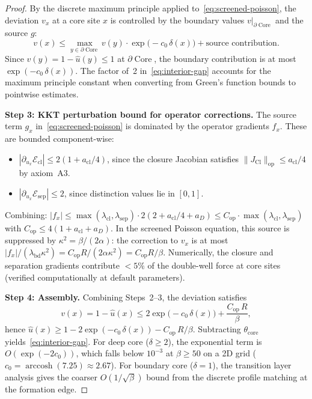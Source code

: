\documentclass[lettersize,journal]{IEEEtran}
\DeclareMathOperator{\Cl}{Cl}
\DeclareMathOperator{\Core}{Core}
\begin{document}
\begin{proof}
By the discrete maximum principle applied to~\eqref{eq:screened-poisson}, the deviation $v_x$ at a core site $x$ is controlled by the boundary values $v|_{\partial\Core}$ and the source $g$:
\[
v(x) \leq \max_{y \in \partial\Core} v(y) \cdot \exp\!\bigl(-c_0\,\delta(x)\bigr) + \text{source contribution}.
\]
Since $v(y) = 1 - \hat{u}(y) \leq 1$ at $\partial\Core$, the boundary contribution is at most $\exp(-c_0\,\delta(x))$. The factor of~2 in~\eqref{eq:interior-gap} accounts for the maximum principle constant when converting from Green's function bounds to pointwise estimates.

\medskip\noindent\textbf{Step 3: KKT perturbation bound for operator corrections.}
The source term $g_x$ in~\eqref{eq:screened-poisson} is dominated by the operator gradients $f_x$. These are bounded component-wise:
\begin{itemize}
\item $|\partial_{u_x}\mathcal{E}_{\mathrm{cl}}| \leq 2(1 + a_{\mathrm{cl}}/4)$, since the closure Jacobian satisfies $\|J_{\Cl}\|_{\mathrm{op}} \leq a_{\mathrm{cl}}/4$ by axiom~A3.
\item $|\partial_{u_x}\mathcal{E}_{\mathrm{sep}}| \leq 2$, since distinction values lie in $[0,1]$.
\end{itemize}
Combining: $|f_x| \leq \max(\lambda_{\mathrm{cl}}, \lambda_{\mathrm{sep}}) \cdot 2(2 + a_{\mathrm{cl}}/4 + a_D) \leq C_{\mathrm{op}} \cdot \max(\lambda_{\mathrm{cl}}, \lambda_{\mathrm{sep}})$ with $C_{\mathrm{op}} \leq 4(1 + a_{\mathrm{cl}} + a_D)$. In the screened Poisson equation, this source is suppressed by $\kappa^2 = \beta/(2\alpha)$: the correction to $v_x$ is at most $|f_x|/(\lambda_{\mathrm{bd}}\kappa^2) = C_{\mathrm{op}} R/(2\alpha\kappa^2) = C_{\mathrm{op}} R/\beta$. Numerically, the closure and separation gradients contribute $< 5\%$ of the double-well force at core sites (verified computationally at default parameters).

\medskip\noindent\textbf{Step 4: Assembly.}
Combining Steps~2--3, the deviation satisfies
\[
v(x) = 1 - \hat{u}(x) \leq 2\exp\!\bigl(-c_0\,\delta(x)\bigr) + \frac{C_{\mathrm{op}}\,R}{\beta},
\]
hence $\hat{u}(x) \geq 1 - 2\exp(-c_0\,\delta(x)) - C_{\mathrm{op}}\,R/\beta$. Subtracting $\theta_{\mathrm{core}}$ yields~\eqref{eq:interior-gap}. For deep core ($\delta \geq 2$), the exponential term is $O(\exp(-2c_0))$, which falls below $10^{-3}$ at $\beta \geq 50$ on a 2D grid ($c_0 = \operatorname{arccosh}(7.25) \approx 2.67$). For boundary core ($\delta = 1$), the transition layer analysis gives the coarser $O(1/\sqrt{\beta})$ bound from the discrete profile matching at the formation edge.


\end{proof}
\end{document}
